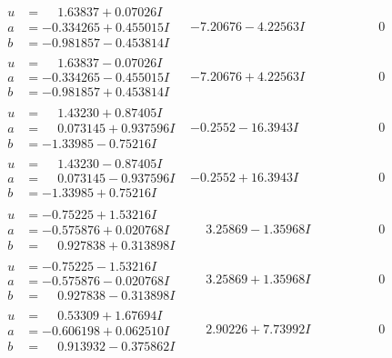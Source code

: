 \documentclass[1p]{elsarticle_modified}
\theoremstyle{definition}
\begin{document}
$$\begin{array}{c|c|c}
\begin{aligned}
u &= \phantom{-}1.63837 + 0.07026 I \\
a &= -0.334265 + 0.455015 I \\
b &= -0.981857 - 0.453814 I\end{aligned}
 & -7.20676 - 4.22563 I & \phantom{-0.000000 } 0 \\ \hline\begin{aligned}
u &= \phantom{-}1.63837 - 0.07026 I \\
a &= -0.334265 - 0.455015 I \\
b &= -0.981857 + 0.453814 I\end{aligned}
 & -7.20676 + 4.22563 I & \phantom{-0.000000 } 0 \\ \hline\begin{aligned}
u &= \phantom{-}1.43230 + 0.87405 I \\
a &= \phantom{-}0.073145 + 0.937596 I \\
b &= -1.33985 - 0.75216 I\end{aligned}
 & -0.2552 - 16.3943 I & \phantom{-0.000000 } 0 \\ \hline\begin{aligned}
u &= \phantom{-}1.43230 - 0.87405 I \\
a &= \phantom{-}0.073145 - 0.937596 I \\
b &= -1.33985 + 0.75216 I\end{aligned}
 & -0.2552 + 16.3943 I & \phantom{-0.000000 } 0 \\ \hline\begin{aligned}
u &= -0.75225 + 1.53216 I \\
a &= -0.575876 + 0.020768 I \\
b &= \phantom{-}0.927838 + 0.313898 I\end{aligned}
 & \phantom{-}3.25869 - 1.35968 I & \phantom{-0.000000 } 0 \\ \hline\begin{aligned}
u &= -0.75225 - 1.53216 I \\
a &= -0.575876 - 0.020768 I \\
b &= \phantom{-}0.927838 - 0.313898 I\end{aligned}
 & \phantom{-}3.25869 + 1.35968 I & \phantom{-0.000000 } 0 \\ \hline\begin{aligned}
u &= \phantom{-}0.53309 + 1.67694 I \\
a &= -0.606198 + 0.062510 I \\
b &= \phantom{-}0.913932 - 0.375862 I\end{aligned}
 & \phantom{-}2.90226 + 7.73992 I & \phantom{-0.000000 } 0 \\ \hline\begin{aligned}

\end{aligned}
\end{array}$$
\end{document}
